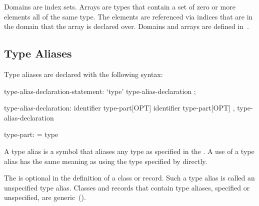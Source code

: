Domains are index sets.  Arrays are types that contain a set of zero
or more elements all of the same type.  The elements are referenced
via indices that are in the domain that the array is declared over.
Domains and arrays are defined in~.

\subsection{Type Aliases}
\label{Type_Aliases}

Type aliases are declared with the following syntax:
\begin{syntax}
type-alias-declaration-statement:
  `type' type-alias-declaration ;

type-alias-declaration:
  identifier type-part[OPT]
  identifier type-part[OPT] , type-alias-declaration

type-part:
  = type
\end{syntax}
A type alias is a symbol that aliases any type as specified in the
.  A use of a type alias has the same meaning as using
the type specified by  directly.

The  is optional in the definition of a class or
record.  Such a type alias is called an unspecified type
alias. Classes and records that contain type aliases, specified or
unspecified, are generic~().
